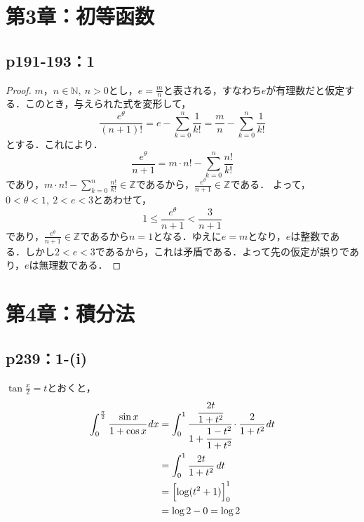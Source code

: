 \documentclass[uplatex,dvipdfmx,a4paper,10pt,fleqn]{jsarticle}
\begin{document}
\section*{第3章：初等函数}


\subsection*{p191-193：1}


\begin{tleftbar}
    \begin{proof}
        $m，n \in \mathbb{N},~n >0$とし，$e=\frac{m}{n}$と表される，すなわち$e$が有理数だと仮定する．このとき，与えられた式を変形して，
        \[
            \frac{e^\theta}{(n+1)!} = e-\sum_{k=0}^{n} \frac{1}{k!} =\frac{m}{n}-\sum_{k=0}^{n} \frac{1}{k!}
        \]
        とする．これにより．
        \[
            \frac{e^{\theta}}{n+1} = m \cdot n! - \sum_{k=0}^{n} \frac{n!}{k!}
        \]
        であり，$m \cdot n! - \sum_{k=0}^{n} \frac{n!}{k!} \in \mathbb{Z}$であるから，$\frac{e^{\theta}}{n+1} \in \mathbb{Z}$である．
        よって，$0< \theta <1,~2<e<3$とあわせて，
        \[
            1 \le \frac{e^{\theta}}{n+1} < \frac{3}{n+1}
        \]
        であり，$\frac{e^{\theta}}{n+1} \in \mathbb{Z}$であるから$n=1$となる．ゆえに$e=m$となり，$e$は整数である．しかし$2<e<3$であるから，これは矛盾である．よって先の仮定が誤りであり，$e$は無理数である．
    \end{proof}
\end{tleftbar}

\section*{第4章：積分法}

\subsection*{p239：1-(i)}

\begin{screen}
	 $\tan \frac{x}{2}=t$とおくと，
	\begin{align*}
		\int_{0}^{\frac{\pi}{2}} \cfrac{\sin x}{1+\cos x} \, dx & = \int_{0}^{1} \cfrac{\cfrac{2t}{1+t^2}}{1+\cfrac{1-t^2}{1+t^2}} \cdot \cfrac{2}{1+t^2} \, dt \\
		& = \int_{0}^{1} \frac{2t}{1+t^2} \, dt \\
		& = \Bigl[\log (t^2+1)\Bigl]_{0}^{1} \\
		& = \log 2-0 = \log 2
	\end{align*}
\end{screen}
\end{document}
